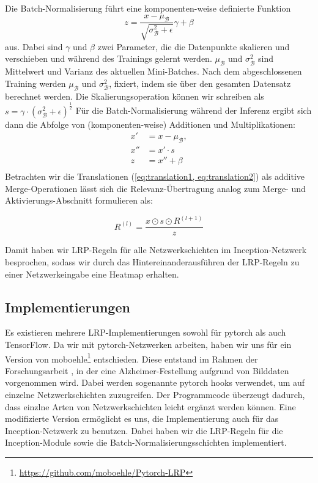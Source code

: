 \documentclass[11pt,a4paper]{article}
\numberwithin{equation}{section}
\begin{document}
	Die Batch-Normalisierung führt eine komponenten-weise definierte Funktion 
	\begin{equation}
		z = \frac{x -\mu_\mathcal{B}}{\sqrt{\sigma_\mathcal{B}^2 + \epsilon}}\gamma + \beta
	\end{equation}
	aus. Dabei sind $\gamma$ und $\beta$ zwei Parameter, die die Datenpunkte skalieren und verschieben und während des Trainings gelernt werden. $\mu_\mathcal{B}$ und $\sigma_\mathcal{B}^2$ sind Mittelwert und Varianz des aktuellen Mini-Batches. Nach dem abgeschlossenen Training werden $\mu_\mathcal{B}$ und $\sigma_\mathcal{B}^2$, fixiert, indem sie über den gesamten Datensatz berechnet werden. Die Skalierungsoperation können wir schreiben als $s=\gamma \cdot (\sigma_\mathcal{B}^2 + \epsilon)^{\frac{1}{2}}$ Für die Batch-Normalisierung während der Inferenz ergibt sich dann die Abfolge von (komponenten-weise) Additionen und Multiplikationen:
	\begin{align}
		x' &= x- \mu_\mathcal{B},\\ \label{eq:translation1}
		x'' &= x' \cdot s\\
		z &= x'' + \beta \\ \label{eq:translation2}
	\end{align}
	Betrachten wir die Translationen (\autoref{eq:translation1, eq:translation2}) als additive Merge-Operationen lässt sich die Relevanz-Übertragung analog zum Merge- und Aktivierungs-Abschnitt formulieren als:
	
	\begin{equation}
		R^{(l)} = \frac{x \odot s \odot R^{(l+1)}}{z}
	\end{equation}
	
	Damit haben wir LRP-Regeln für alle Netzwerkschichten im Inception-Netzwerk besprochen, sodass wir durch das Hintereinanderausführen der LRP-Regeln zu einer Netzwerkeingabe eine Heatmap erhalten.
	
	
	\subsection{Implementierungen}
	Es existieren mehrere LRP-Implementierungen sowohl für pytorch als auch TensorFlow. Da wir mit pytorch-Netzwerken arbeiten, haben wir uns für ein Version von moboehle\footnote{\url{https://github.com/moboehle/Pytorch-LRP}} entschieden. Diese entstand im Rahmen der Forschungsarbeit \cite{lrp_alzheimer}, in der eine Alzheimer-Festellung aufgrund von Bilddaten vorgenommen wird. Dabei werden sogenannte pytorch hooks verwendet, um auf einzelne Netzwerkschichten zuzugreifen. Der Programmcode überzeugt dadurch, dass einzlne Arten von Netzwerkschichten leicht ergänzt werden können. Eine modifizierte Version ermöglicht es uns, die Implementierung auch für das Inception-Netzwerk zu benutzen. Dabei haben  wir die LRP-Regeln für die Inception-Module sowie die Batch-Normalisierungsschichten implementiert.
	
\end{document}
